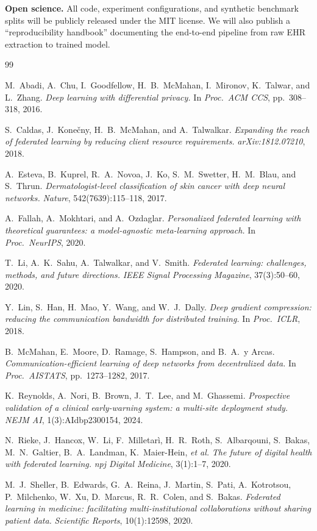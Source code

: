\textbf{Open science.} All code, experiment configurations, and synthetic benchmark splits
will be publicly released under the MIT license. We will also publish a ``reproducibility
handbook'' documenting the end-to-end pipeline from raw EHR extraction to trained model.


\begin{thebibliography}{99}

M.\ Abadi, A.\ Chu, I.\ Goodfellow, H.\ B.\ McMahan, I.\ Mironov, K.\ Talwar, and L.\ Zhang.
\emph{Deep learning with differential privacy.}
In \textit{Proc.\ ACM CCS}, pp.\ 308--318, 2016.

S.\ Caldas, J.\ Kone\v{c}ny, H.\ B.\ McMahan, and A.\ Talwalkar.
\emph{Expanding the reach of federated learning by reducing client resource requirements.}
\textit{arXiv:1812.07210}, 2018.

A.\ Esteva, B.\ Kuprel, R.\ A.\ Novoa, J.\ Ko, S.\ M.\ Swetter, H.\ M.\ Blau, and S.\ Thrun.
\emph{Dermatologist-level classification of skin cancer with deep neural networks.}
\textit{Nature}, 542(7639):115--118, 2017.

A.\ Fallah, A.\ Mokhtari, and A.\ Ozdaglar.
\emph{Personalized federated learning with theoretical guarantees: a model-agnostic
  meta-learning approach.}
In \textit{Proc.\ NeurIPS}, 2020.

T.\ Li, A.\ K.\ Sahu, A.\ Talwalkar, and V.\ Smith.
\emph{Federated learning: challenges, methods, and future directions.}
\textit{IEEE Signal Processing Magazine}, 37(3):50--60, 2020.

Y.\ Lin, S.\ Han, H.\ Mao, Y.\ Wang, and W.\ J.\ Dally.
\emph{Deep gradient compression: reducing the communication bandwidth for distributed
  training.}
In \textit{Proc.\ ICLR}, 2018.

B.\ McMahan, E.\ Moore, D.\ Ramage, S.\ Hampson, and B.\ A.\ y Arcas.
\emph{Communication-efficient learning of deep networks from decentralized data.}
In \textit{Proc.\ AISTATS}, pp.\ 1273--1282, 2017.

K.\ Reynolds, A.\ Nori, B.\ Brown, J.\ T.\ Lee, and M.\ Ghassemi.
\emph{Prospective validation of a clinical early-warning system: a multi-site
  deployment study.}
\textit{NEJM AI}, 1(3):AIdbp2300154, 2024.

N.\ Rieke, J.\ Hancox, W.\ Li, F.\ Milletar\`{i}, H.\ R.\ Roth, S.\ Albarqouni,
S.\ Bakas, M.\ N.\ Galtier, B.\ A.\ Landman, K.\ Maier-Hein, \emph{et al.}
\emph{The future of digital health with federated learning.}
\textit{npj Digital Medicine}, 3(1):1--7, 2020.

M.\ J.\ Sheller, B.\ Edwards, G.\ A.\ Reina, J.\ Martin, S.\ Pati, A.\ Kotrotsou,
P.\ Milchenko, W.\ Xu, D.\ Marcus, R.\ R.\ Colen, and S.\ Bakas.
\emph{Federated learning in medicine: facilitating multi-institutional collaborations
  without sharing patient data.}
\textit{Scientific Reports}, 10(1):12598, 2020.

\end{thebibliography}
